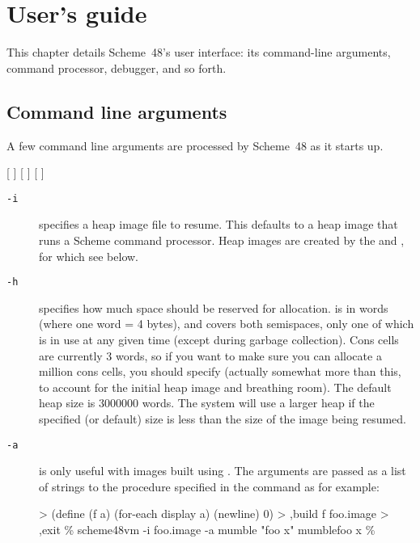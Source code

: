 
\chapter{User's guide}

This chapter details Scheme~48's user interface: its command-line arguments,
 command processor, debugger, and so forth.

\section{Command line arguments}

A few command line arguments are processed by Scheme~48 as
 it starts up.

[ ]
[ ]
[ ]

\begin{description}
\item[{\tt -i} ]
    specifies a heap image file to resume.  This defaults to a heap
    image that runs a Scheme command processor.  Heap images are
    created by the  and , for which see below.

\item[{\tt -h} ]
    specifies how much space should be reserved for allocation.
     is in words (where one word = 4 bytes), and covers both
    semispaces, only one of which is in use at any given time (except
    during garbage collection).  Cons cells are currently 3 words, so
    if you want to make sure you can allocate a million cons cells,
    you should specify  (actually somewhat more than this,
    to account for the initial heap image and breathing room).
    The default heap size is 3000000 words.  The system will use a
    larger heap if the specified (or default) size is less than
    the size of the image being resumed.


\item[{\tt -a} ]
    is only useful with images built using .
    The arguments are passed as a list of strings to the procedure specified
    in the  command as for example:
\begin{example}
> (define (f a) (for-each display a) (newline) 0)
> ,build f foo.image
> ,exit
\% scheme48vm -i foo.image -a mumble "foo x"
mumblefoo x
\%
\end{example}
\end{description}

